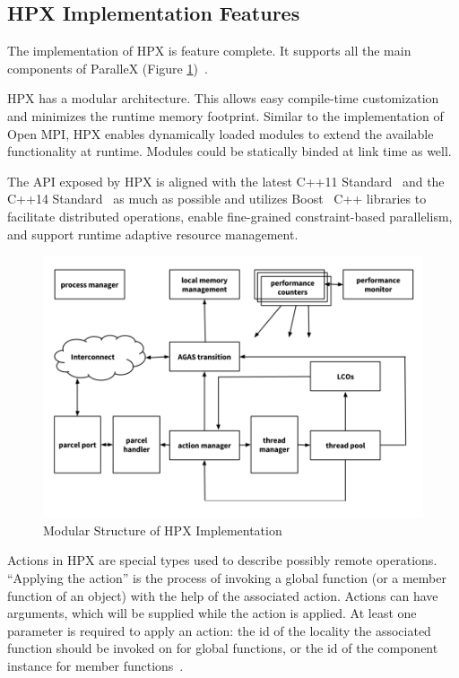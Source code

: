 \subsection{HPX Implementation Features}

The implementation of HPX is feature complete. It supports all the main components of ParalleX (Figure \ref{fig:hpx-structure})~\cite{anderson2013tabulated}.

HPX has a modular architecture. This allows easy compile-time customization and minimizes the runtime memory footprint. Similar to the implementation of Open MPI, HPX enables dynamically loaded modules to extend the available functionality at runtime. Modules could be statically binded at link time as well.

The API exposed by HPX is aligned with the latest C++11 Standard~\cite{c++11} and the C++14 Standard~\cite{c++14} as much as possible and utilizes Boost~\cite{dawes2009boost} C++ libraries to facilitate distributed operations, enable fine-grained constraint-based parallelism, and support runtime adaptive resource management\cite{kaiser2014hpx}.

\begin{figure}[ht]
\centering
\includegraphics[scale=0.47]{images/hpx.png}
\caption[Modular Structure of HPX Implementation]{Modular Structure of HPX Implementation}
\label{fig:hpx-structure}
\end{figure}

Actions in HPX are special types used to describe possibly remote operations. ``Applying the action'' is the process of invoking a global function (or a member function of an object) with the help of the associated action. Actions can have arguments, which will be supplied while the action is applied. At least one parameter is required to apply an action: the id of the locality the associated function should be invoked on for global functions, or the id of the component instance for member functions~\cite{ghimire2014data}.

